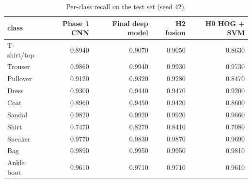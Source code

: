 \begin{table}[t]
\centering
\caption{Per-class recall on the test set (seed 42).}
\label{tab:p2_recall}
\footnotesize
\begin{tabular}{lrrrr}
\toprule
class & Phase 1 CNN & Final deep model & H2 fusion & H0 HOG + SVM \\
\midrule
T-shirt/top & 0.8940 & 0.9070 & 0.9050 & 0.8630 \\
Trouser & 0.9860 & 0.9940 & 0.9930 & 0.9730 \\
Pullover & 0.9120 & 0.9320 & 0.9280 & 0.8470 \\
Dress & 0.9300 & 0.9440 & 0.9470 & 0.9200 \\
Coat & 0.8960 & 0.9450 & 0.9420 & 0.8600 \\
Sandal & 0.9820 & 0.9920 & 0.9920 & 0.9660 \\
Shirt & 0.7470 & 0.8270 & 0.8410 & 0.7080 \\
Sneaker & 0.9770 & 0.9830 & 0.9870 & 0.9690 \\
Bag & 0.9890 & 0.9950 & 0.9950 & 0.9810 \\
Ankle boot & 0.9610 & 0.9710 & 0.9710 & 0.9610 \\
\bottomrule
\end{tabular}
\end{table}
